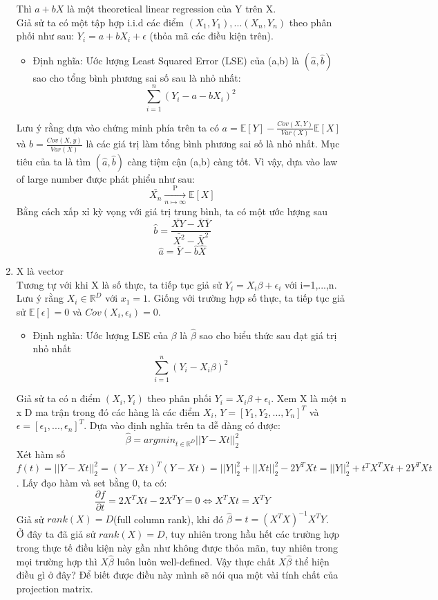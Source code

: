 \documentclass[10pt]{article}
\begin{document}
\begin{enumerate}
\begin{itemize}
\end{itemize}
Thì $a+bX$ là một theoretical linear regression của Y trên X.\\ 
Giả sử ta có một tập hợp i.i.d các điểm $(X_1, Y_1),...(X_n, Y_n)$ theo phân phối như sau: $Y_i = a + bX_i + \epsilon$ (thỏa mã các điều kiện trên).
\begin{itemize}

\item Định nghĩa: Ước lượng Least Squared Error (LSE) của (a,b) là $(\hat{a}, \hat{b})$ sao cho tổng bình phương sai số sau là nhỏ nhất:
\[ \sum_{i=1}^{n} (Y_i - a - bX_i)^2 \]

\end{itemize}

Lưu ý rằng dựa vào chứng minh phía trên ta có $a=\mathbb{E}[Y] - \frac{Cov(X,Y)}{Var(X)}\mathbb{E}[X]$ và $b= \frac{Cov(X,y)}{Var(X)}$ là các giá trị làm tổng bình phương sai số là nhỏ nhất. Mục tiêu của ta là tìm $(\hat{a}, \hat{b})$ càng tiệm cận (a,b) càng tốt. Vì vậy, dựa vào law of large number được phát phiểu như sau:
\[ \bar{X_n} \xrightarrow[n \longmapsto \infty]{\text{P}} \mathbb{E}[X]  \]
Bằng cách xấp xỉ kỳ vọng với giá trị trung bình, ta có một ước lượng sau 
\[\hat{b} = \frac{\bar{XY} - \bar{X}\bar{Y}}{\bar{X^2}-\bar{X}^2} \]
\[ \hat{a} = \bar{Y} - \hat{b}\hat{X} \]

\item X là vector\\
Tương tự với khi X là số thực, ta tiếp tục giả sử $Y_i = X_i\beta + \epsilon_i$ với i=1,...,n. Lưu ý rằng $X_i \in \mathbb{R}^{D}$ với $x_1=1$. Giống với trường hợp số thực, ta tiếp tục giả sử $\mathbb{E}[\epsilon] = 0$ và $Cov(X_i, \epsilon_i) = 0$.
\begin{itemize}

\item Định nghĩa: Ước lượng LSE của $\beta$ là $\hat{\beta}$ sao cho biểu thức sau đạt giá trị nhỏ nhất
\[ \sum_{i=1}^{n}(Y_i - X_i\beta)^2\]
\end{itemize}

Giả sử ta có n điểm $(X_i, Y_i)$ theo phân phối $Y_i = X_i\beta + \epsilon_i$. Xem X là một n x D ma trận trong đó các hàng là các điểm $X_i$, $Y = [Y_1, Y_2,...,Y_n]^{T}$ và $\epsilon = [\epsilon_1,...,\epsilon_n]^{T}$. Dựa vào định nghĩa trên ta dễ dàng có được:
\[ \hat{\beta} = argmin_{t \in \mathbb{R}^{D}}||Y-Xt ||_{2}^{2} \]
Xét hàm số $f(t)=||Y-Xt ||_{2}^{2}=(Y-Xt)^{T}(Y-Xt)=|| Y||_{2}^{2} + || Xt||^{2}_{2} - 2Y^{T}Xt = ||Y||^2_2 + t^{T}X^{T}Xt + 2Y^{T}Xt$. Lấy đạo hàm và set bằng 0, ta có:
\[\frac{\partial f}{\partial t}=2X^{T}Xt - 2X^{T}Y=0 \Longleftrightarrow X^{T}Xt = X^{T}Y \]
Giả sử $rank(X)=D$(full column rank), khi đó $\hat{\beta}=t=(X^{T}X)^{-1}X^{T}Y$.\\ 
Ở đây ta đã giả sử $rank(X)=D$, tuy nhiên trong hầu hết các trường hợp trong thực tế điều kiện này gần như không được thỏa mãn, tuy nhiên trong mọi trường hợp thì $X\hat{\beta}$ luôn luôn well-defined. Vậy thực chất $X\hat{\beta}$ thể hiện điều gì ở đây? Để biết được điều này mình sẽ nói qua một vài tính chất của projection matrix.\\


\end{enumerate}
\end{document}
